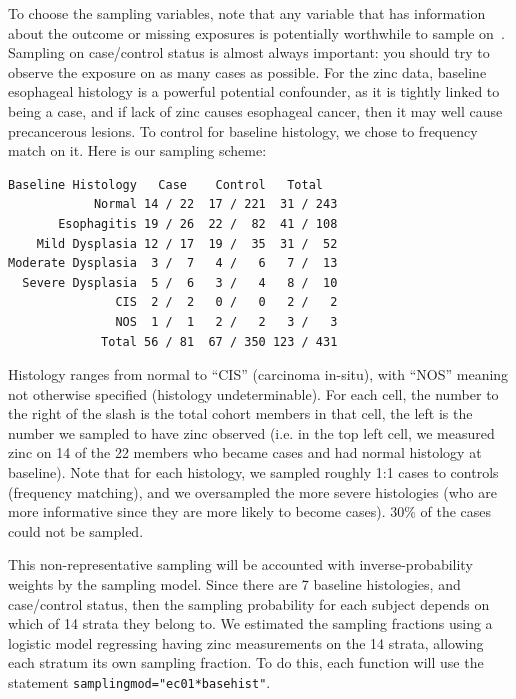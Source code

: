 \documentclass[10pt]{article}
\begin{document}
To choose the sampling variables, note that any variable that has information about the
outcome or missing exposures is potentially worthwhile to sample on~\cite{Mark:Katki:06}.
Sampling on case/control status is almost always important: you should try to observe the
exposure on as many cases as possible.  For the zinc data, baseline esophageal histology
is a powerful potential confounder, as it is tightly linked to being a case, and if lack
of zinc causes esophageal cancer, then it may well cause precancerous lesions.  To control
for baseline histology, we chose to frequency match on it.  Here is our sampling scheme:

\begin{verbatim}
Baseline Histology   Case    Control   Total  
            Normal 14 / 22  17 / 221  31 / 243
       Esophagitis 19 / 26  22 /  82  41 / 108
    Mild Dysplasia 12 / 17  19 /  35  31 /  52
Moderate Dysplasia  3 /  7   4 /   6   7 /  13
  Severe Dysplasia  5 /  6   3 /   4   8 /  10
               CIS  2 /  2   0 /   0   2 /   2                               
               NOS  1 /  1   2 /   2   3 /   3                   
             Total 56 / 81  67 / 350 123 / 431
\end{verbatim}
Histology ranges from normal to ``CIS'' (carcinoma in-situ), with ``NOS'' meaning not
otherwise specified (histology undeterminable).  For each cell, the number to the right of
the slash is the total cohort members in that cell, the left is the number we sampled to
have zinc observed (i.e. in the top left cell, we measured zinc on 14 of the 22 members
who became cases and had normal histology at baseline).  Note that for each histology, we
sampled roughly 1:1 cases to controls (frequency matching), and we oversampled the more
severe histologies (who are more informative since they are more likely to become cases).
30\% of the cases could not be sampled.

This non-representative sampling will be accounted with inverse-probability weights by the
sampling model.  Since there are 7 baseline histologies, and case/control status, then the
sampling probability for each subject depends on which of 14 strata they belong to.  We
estimated the sampling fractions using a logistic model regressing having zinc
measurements on the 14 strata, allowing each stratum its own sampling fraction.  To do
this, each function will use the statement \texttt{samplingmod="ec01*basehist"}.
\end{document}
